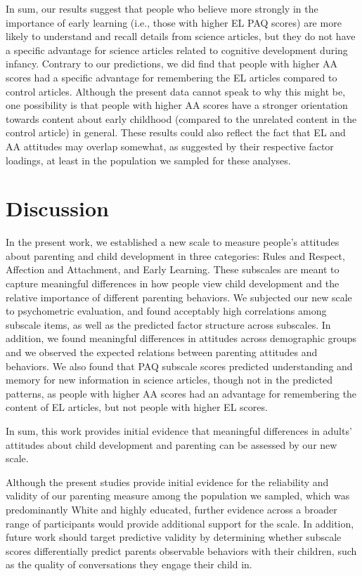 \documentclass[floatsintext,man]{apa6}
\theoremstyle{definition}
\theoremstyle{definition}
\theoremstyle{definition}
\theoremstyle{remark}
\begin{document}
In sum, our results suggest that people who believe more strongly in the
importance of early learning (i.e., those with higher EL PAQ scores) are
more likely to understand and recall details from science articles, but
they do not have a specific advantage for science articles related to
cognitive development during infancy. Contrary to our predictions, we
did find that people with higher AA scores had a specific advantage for
remembering the EL articles compared to control articles. Although the
present data cannot speak to why this might be, one possibility is that
people with higher AA scores have a stronger orientation towards content
about early childhood (compared to the unrelated content in the control
article) in general. These results could also reflect the fact that EL
and AA attitudes may overlap somewhat, as suggested by their respective
factor loadings, at least in the population we sampled for these
analyses.

\section{Discussion}\label{discussion}

In the present work, we established a new scale to measure people's
attitudes about parenting and child development in three categories:
Rules and Respect, Affection and Attachment, and Early Learning. These
subscales are meant to capture meaningful differences in how people view
child development and the relative importance of different parenting
behaviors. We subjected our new scale to psychometric evaluation, and
found acceptably high correlations among subscale items, as well as the
predicted factor structure across subscales. In addition, we found
meaningful differences in attitudes across demographic groups and we
observed the expected relations between parenting attitudes and
behaviors. We also found that PAQ subscale scores predicted
understanding and memory for new information in science articles, though
not in the predicted patterns, as people with higher AA scores had an
advantage for remembering the content of EL articles, but not people
with higher EL scores.

In sum, this work provides initial evidence that meaningful differences
in adults' attitudes about child development and parenting can be
assessed by our new scale.

Although the present studies provide initial evidence for the
reliability and validity of our parenting measure among the population
we sampled, which was predominantly White and highly educated, further
evidence across a broader range of participants would provide additional
support for the scale. In addition, future work should target predictive
validity by determining whether subscale scores differentially predict
parents observable behaviors with their children, such as the quality of
conversations they engage their child in.
\end{document}
